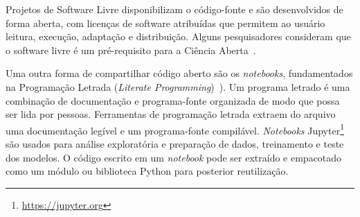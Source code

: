 Projetos de Software Livre disponibilizam o código-fonte e são 
desenvolvidos de forma aberta, com licenças de software atribuídas que permitem ao usuário leitura, execução, adaptação e distribuição.
%
Alguns pesquisadores consideram que o software livre é um pré-requisito para a Ciência Aberta~\cite{flach:sbc:2021,10.12688/f1000research.23224.2}.

Uma outra forma de compartilhar código aberto são os \textit{notebooks}, fundamentados na Programação Letrada (\textit{Literate Programming})~\cite{knuth:84}). 
Um programa letrado é uma combinação de documentação e programa-fonte organizada de modo que possa ser lida por pessoas.
Ferramentas de programação letrada extraem do arquivo uma documentação legível e um programa-fonte compilável. 
\textit{Notebooks} Jupyter\footnote{\url{https://jupyter.org}} são usados para análise exploratória e preparação de dados, treinamento e teste dos modelos. O código escrito em um \textit{notebook} pode ser extraído e empacotado como um módulo ou biblioteca Python para posterior reutilização.










